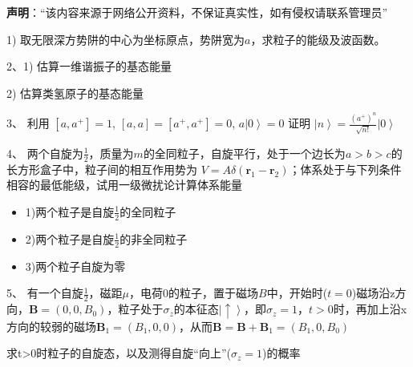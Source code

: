 
\textbf{声明}：“该内容来源于网络公开资料，不保证真实性，如有侵权请联系管理员”


1) 取无限深方势阱的中心为坐标原点，势阱宽为$a$，求粒子的能级及波函数。

2、1) 估算一维谐振子的基态能量

2) 估算类氢原子的基态能量

3、 利用 $[a,a^+]=1$, \quad $[a,a]=[a^+,a^+]=0$, \quad $a \left| 0 \right\rangle =0$ 证明 $\left| n \right\rangle = \frac{(a^+)^n}{\sqrt{n!}} \left| 0 \right\rangle$

4、 两个自旋为$\frac{1}{2}$，质量为$m$的全同粒子，自旋平行，处于一个边长为$a>b>c$的长方形盒子中，粒子间的相互作用势为 $V=A\delta (\mathbf{r}_1 - \mathbf{r}_2)$；体系处于与下列条件相容的最低能级，试用一级微扰论计算体系能量

\begin{itemize}
    \item 1)两个粒子是自旋$\frac{1}{2}$的全同粒子
    \item 2)两个粒子是自旋$\frac{1}{2}$的非全同粒子
    \item 3)两个粒子自旋为零
\end{itemize}

5、 有一个自旋$\frac{1}{2}$，磁距$\mu$，电荷0的粒子，置于磁场$B$中，开始时($t=0$)磁场沿z方向，$\mathbf{B}= \left( 0, 0, B_0 \right)$，粒子处于$\sigma_z$的本征态$\left| \uparrow \right\rangle$，即$\sigma_z = 1$，$t>0$时，再加上沿x方向的较弱的磁场$\mathbf{B}_1 = \left( B_1, 0, 0 \right)$，从而$\mathbf{B} = \mathbf{B} + \mathbf{B}_1 = \left( B_1, 0, B_0 \right)$

求t>0时粒子的自旋态，以及测得自旋“向上”($\sigma_z=1$)的概率

